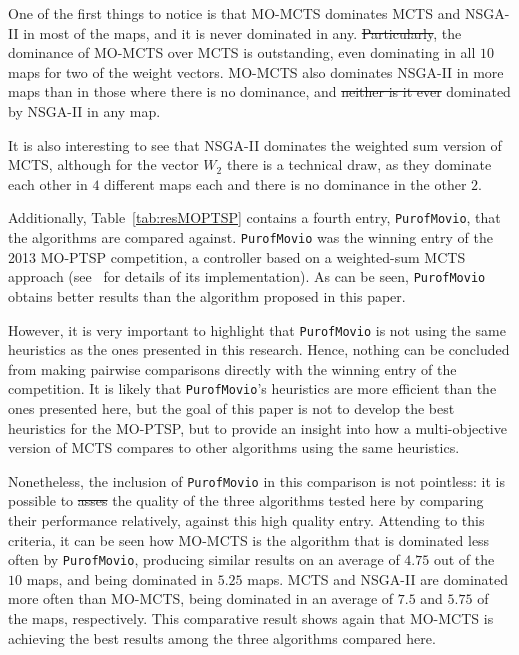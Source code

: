 \documentclass[journal]{IEEEtran}
\providecommand{\DIFaddtex}[1]{{\protect\color{blue}\uwave{#1}}} %
\providecommand{\DIFdeltex}[1]{{\protect\color{red}\sout{#1}}}                      %
\providecommand{\DIFaddbegin}{} %
\providecommand{\DIFaddend}{} %
\providecommand{\DIFdelbegin}{} %
\providecommand{\DIFdelend}{} %
\providecommand{\DIFadd}[1]{\texorpdfstring{\DIFaddtex{#1}}{#1}} %
\providecommand{\DIFdel}[1]{\texorpdfstring{\DIFdeltex{#1}}{}} %
\begin{document}
One of the first things to notice is that MO-MCTS dominates MCTS and NSGA-II in most of the maps, and it is never dominated in any. \DIFdelbegin \DIFdel{Particularly}\DIFdelend \DIFaddbegin \DIFadd{In particular}\DIFaddend , the dominance of MO-MCTS over MCTS is outstanding, even dominating in all $10$ maps for two of the weight vectors. MO-MCTS also dominates NSGA-II in more maps than in those where there is no dominance, and  \DIFdelbegin \DIFdel{neither is it ever }\DIFdelend \DIFaddbegin \DIFadd{is never }\DIFaddend dominated by NSGA-II in any map. 

It is also interesting to see that NSGA-II dominates the weighted sum version of MCTS, although for the vector $W_2$ there is a technical draw, as they dominate each other in $4$ different maps each and there is no dominance in the other $2$.

Additionally, Table~\ref{tab:resMOPTSP} contains a fourth entry, \texttt{PurofMovio}, that the algorithms are compared against. \texttt{PurofMovio} was the winning entry of the 2013 MO-PTSP competition, a controller based on a weighted-sum MCTS approach (see~\cite{Powley2013} for details of its implementation). As can be seen, \texttt{PurofMovio} obtains better results than the algorithm proposed in this paper.

However, it is very important to highlight that \texttt{PurofMovio} is not using the same heuristics as the ones presented in this research. Hence, nothing can be concluded from making pairwise comparisons directly with the winning entry of the competition. It is likely that \texttt{PurofMovio}'s heuristics are more efficient than the ones presented here, but the goal of this paper is not to develop the best heuristics for the MO-PTSP, but to provide an insight into how a multi-objective version of MCTS compares to other algorithms using the same heuristics.

Nonetheless, the inclusion of \texttt{PurofMovio} in this comparison is not pointless: it is possible to \DIFdelbegin \DIFdel{asses }\DIFdelend \DIFaddbegin \DIFadd{assess }\DIFaddend the quality of the three algorithms tested here by comparing their performance relatively, against this high quality entry. Attending to this criteria, it can be seen how MO-MCTS is the algorithm that is dominated less often by \texttt{PurofMovio}, producing similar results on an average of $4.75$ out of the $10$ maps, and being dominated in $5.25$ maps. MCTS and NSGA-II are dominated more often than MO-MCTS, being dominated in an average of $7.5$ and $5.75$ of the maps, respectively. This comparative result shows again that MO-MCTS is achieving the best results among the three algorithms compared here.
\end{document}
